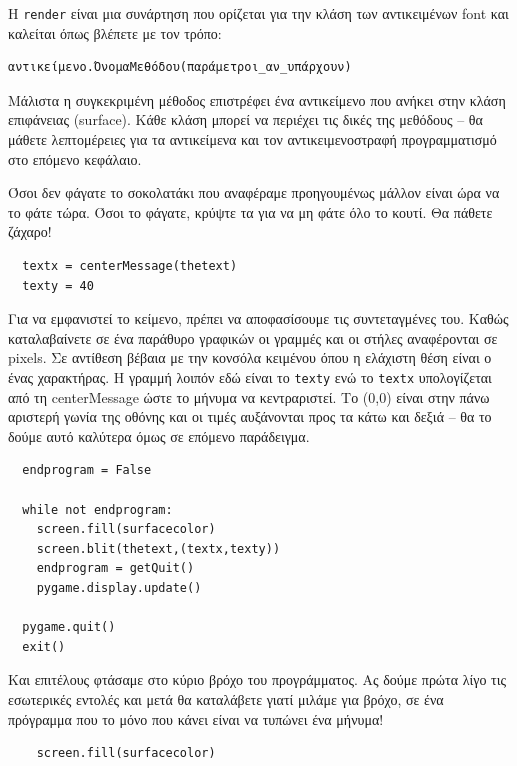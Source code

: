 Η {\tt render} είναι μια συνάρτηση που ορίζεται για  την κλάση των αντικειμένων font και καλείται όπως βλέπετε με τον τρόπο:

\begin{verbatim}
αντικείμενο.ΌνομαΜεθόδου(παράμετροι_αν_υπάρχουν)
\end{verbatim}

Μάλιστα η συγκεκριμένη μέθοδος επιστρέφει ένα αντικείμενο που ανήκει στην κλάση επιφάνειας (surface). Κάθε κλάση μπορεί να περιέχει τις δικές της μεθόδους -- θα μάθετε λεπτομέρειες για τα αντικείμενα και τον αντικειμενοστραφή προγραμματισμό στο επόμενο κεφάλαιο.

Όσοι δεν φάγατε το σοκολατάκι που αναφέραμε προηγουμένως μάλλον είναι ώρα να το φάτε τώρα. Όσοι το φάγατε, κρύψτε τα για να μη φάτε όλο το κουτί. Θα  πάθετε ζάχαρο!

\begin{verbatim}
  textx = centerMessage(thetext)
  texty = 40
\end{verbatim}

Για να εμφανιστεί το κείμενο, πρέπει να αποφασίσουμε τις συντεταγμένες του. Καθώς καταλαβαίνετε σε ένα παράθυρο γραφικών οι γραμμές και οι στήλες αναφέρονται σε pixels. Σε αντίθεση βέβαια με την κονσόλα κειμένου όπου η ελάχιστη θέση είναι ο ένας χαρακτήρας. Η γραμμή λοιπόν εδώ είναι το {\tt texty} ενώ το {\tt textx} υπολογίζεται από τη centerMessage ώστε το μήνυμα να κεντραριστεί. Το (0,0) είναι στην πάνω αριστερή γωνία της οθόνης και οι τιμές αυξάνονται προς τα κάτω και δεξιά -- θα το δούμε αυτό καλύτερα όμως σε επόμενο παράδειγμα.

\begin{verbatim}
  endprogram = False

  while not endprogram:
    screen.fill(surfacecolor)
    screen.blit(thetext,(textx,texty))
    endprogram = getQuit()
    pygame.display.update()

  pygame.quit()
  exit()
\end{verbatim}

Και επιτέλους φτάσαμε στο κύριο βρόχο του προγράμματος. Ας δούμε πρώτα λίγο τις εσωτερικές εντολές και μετά θα καταλάβετε γιατί μιλάμε για βρόχο, σε ένα πρόγραμμα που το μόνο που κάνει είναι να τυπώνει ένα μήνυμα!

\begin{verbatim}
    screen.fill(surfacecolor)
\end{verbatim}

